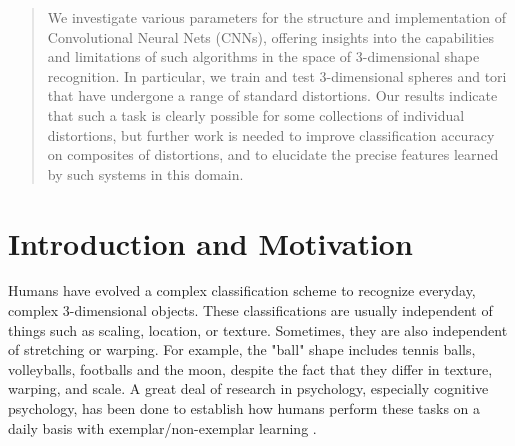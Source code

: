 \documentclass{article}
\begin{document}




\begin{abstract}
We investigate various parameters for the structure and implementation of Convolutional Neural Nets (CNNs),
offering insights into the capabilities and limitations of such algorithms in the space of 3-dimensional shape recognition.
In particular, we train and test 3-dimensional spheres and tori that have undergone a range of standard distortions.
Our results indicate that such a task is clearly possible for some collections of individual distortions,
but further work is needed to improve classification accuracy on composites of distortions, and to elucidate the
precise features learned by such systems in this domain.
\end{abstract}

\section{Introduction and Motivation}
Humans have evolved a complex classification scheme to recognize everyday, complex 3-dimensional objects.
These classifications are usually independent of things such as
scaling, location, or texture. Sometimes, they are also independent
of stretching or warping. For example, the "ball" shape includes tennis balls, volleyballs, footballs and the moon,
despite the fact that they differ in texture, warping, and scale. A great deal of research in psychology,
especially cognitive psychology, has been done to establish how humans perform these tasks on a daily basis with
exemplar/non-exemplar learning \cite{Tennyson1972,sinha2006face}.
\end{document}
